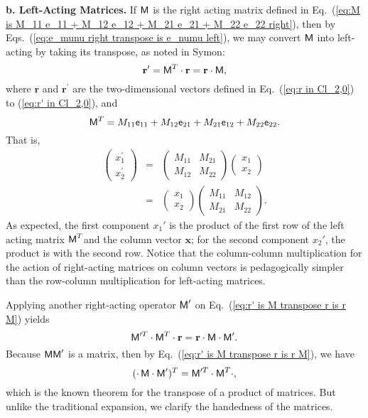 \documentclass[11pt,twocolumn]{article}
\begin{document}
\textbf{b. Left-Acting Matrices.}  If $\textsf M$ is the right acting matrix defined in Eq.~(\ref{eq:M is M_11 e_11 + M_12 e_12 + M_21 e_21 + M_22 e_22 right}), then by Eqs.~(\ref{eq:e_munu right transpose is e_numu left}), we may convert $\textsf M$ into left-acting by taking its transpose, as noted in Symon\cite{Symon_1971_Mechanics_p408}:
\begin{equation}
\label{eq:r' is M transpose r is r M}
\mathbf r^\prime=\textsf M^T\cdot\mathbf r=\mathbf r\cdot\textsf M,
\end{equation}
where $\mathbf r$ and $\mathbf r^\prime$ are the two-dimensional vectors defined in Eq.~(\ref{eq:r in Cl_2,0}) to (\ref{eq:r' in Cl_2,0}), and
\begin{equation}
\label{eq:M transpose component form}
\textsf M^T=M_{11}\textsf e_{11}+M_{12}\textsf e_{21}+M_{21}\textsf e_{12}+M_{22}\textsf e_{22}.
\end{equation}
That is,
\begin{eqnarray}
\label{eq:x' is M transpose x is x M matrix form}
\begin{pmatrix}
x_1^\prime\\
x_2^\prime
\end{pmatrix}
&=&
\begin{pmatrix}
M_{11}&M_{21}\\
M_{12}&M_{22}
\end{pmatrix}
\begin{pmatrix}
x_1\\
x_2
\end{pmatrix}
\\
&=&
\begin{pmatrix}
x_1\\
x_2
\end{pmatrix}
\begin{pmatrix}
M_{11}&M_{12}\\
M_{21}&M_{22}
\end{pmatrix}
.
\end{eqnarray}
As expected, the first component $x_1'$ is the product of the first row of the left acting matrix $\textsf M^T$and the column vector $\mathbf x$; for the second component $x_2'$, the product is with the second row.  Notice that the column-column multiplication for the action of right-acting matrices on column vectors is pedagogically simpler than the row-column multiplication for left-acting matrices.

Applying another right-acting operator $\textsf M'$ on Eq.~(\ref{eq:r' is M transpose r is r M}) yields
\begin{equation}
\label{eq:M' transpose M transpose r is r M M'}
\textsf M'^T\cdot\textsf M^T\cdot\mathbf r=\mathbf r\cdot\textsf M\cdot\textsf M'.
\end{equation}
Because $\textsf M\textsf M'$ is a matrix, then by Eq.~(\ref{eq:r' is M transpose r is r M}), we have
\begin{equation}
(\cdot\,\textsf M\cdot\textsf M')^T=\textsf M'^T\cdot\textsf M^T\cdot,
\end{equation}
which is the known theorem for the transpose of a product of matrices\cite{Heading_1966_MatrixTheoryforPhysicists_p13}.  But unlike the traditional expansion, we clarify the handedness of the matrices.
\end{document}
